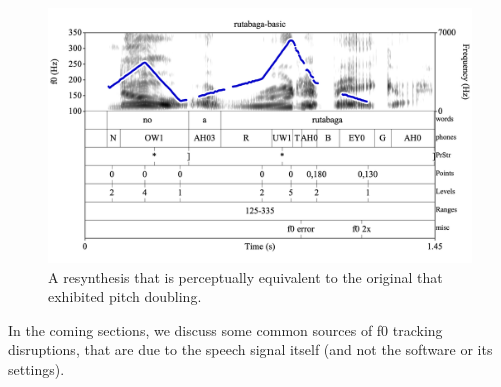 \documentclass[11pt, twoside]{memoir}
\begin{document}
{{{\begin{figure}[H]
\centering
\includegraphics[width=.875\linewidth]{Contours-rutabaga-basic-resynth.png}
\caption{A resynthesis that is perceptually equivalent to the original that exhibited pitch doubling.
\label{fig:rutabaga-resynth f0-tracking}
}
\end{figure}
In the coming sections, we discuss some common sources of f0 tracking disruptions, that are due to the speech signal itself (and not the software or its settings).
}}}
\end{document}
